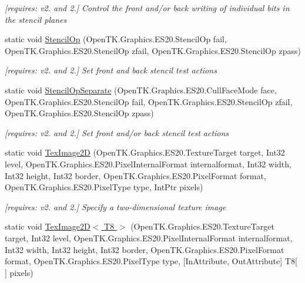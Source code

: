 \begin{DoxyCompactItemize}
\begin{DoxyCompactList}\small\item\em \mbox{[}requires\-: v2. and 2.\mbox{]} Control the front and/or back writing of individual bits in the stencil planes \end{DoxyCompactList}\item 
static void \hyperlink{class_open_t_k_1_1_graphics_1_1_e_s20_1_1_g_l_a177a6e640a89b1aff27d6d22c5ea5382}{Stencil\-Op} (Open\-T\-K.\-Graphics.\-E\-S20.\-Stencil\-Op fail, Open\-T\-K.\-Graphics.\-E\-S20.\-Stencil\-Op zfail, Open\-T\-K.\-Graphics.\-E\-S20.\-Stencil\-Op zpass)
\begin{DoxyCompactList}\small\item\em \mbox{[}requires\-: v2. and 2.\mbox{]} Set front and back stencil test actions \end{DoxyCompactList}\item 
static void \hyperlink{class_open_t_k_1_1_graphics_1_1_e_s20_1_1_g_l_a9c9f118ccf5592dabe9cc918e8df909b}{Stencil\-Op\-Separate} (Open\-T\-K.\-Graphics.\-E\-S20.\-Cull\-Face\-Mode face, Open\-T\-K.\-Graphics.\-E\-S20.\-Stencil\-Op fail, Open\-T\-K.\-Graphics.\-E\-S20.\-Stencil\-Op zfail, Open\-T\-K.\-Graphics.\-E\-S20.\-Stencil\-Op zpass)
\begin{DoxyCompactList}\small\item\em \mbox{[}requires\-: v2. and 2.\mbox{]} Set front and/or back stencil test actions \end{DoxyCompactList}\item 
static void \hyperlink{class_open_t_k_1_1_graphics_1_1_e_s20_1_1_g_l_abfe1aabd4fa5a54dc926a59eacc8c532}{Tex\-Image2\-D} (Open\-T\-K.\-Graphics.\-E\-S20.\-Texture\-Target target, Int32 level, Open\-T\-K.\-Graphics.\-E\-S20.\-Pixel\-Internal\-Format internalformat, Int32 width, Int32 height, Int32 border, Open\-T\-K.\-Graphics.\-E\-S20.\-Pixel\-Format format, Open\-T\-K.\-Graphics.\-E\-S20.\-Pixel\-Type type, Int\-Ptr pixels)
\begin{DoxyCompactList}\small\item\em \mbox{[}requires\-: v2. and 2.\mbox{]} Specify a two-\/dimensional texture image \end{DoxyCompactList}\item 
static void \hyperlink{class_open_t_k_1_1_graphics_1_1_e_s20_1_1_g_l_a6db1ae71bdbc018274c87095320ea738}{Tex\-Image2\-D$<$ T8 $>$} (Open\-T\-K.\-Graphics.\-E\-S20.\-Texture\-Target target, Int32 level, Open\-T\-K.\-Graphics.\-E\-S20.\-Pixel\-Internal\-Format internalformat, Int32 width, Int32 height, Int32 border, Open\-T\-K.\-Graphics.\-E\-S20.\-Pixel\-Format format, Open\-T\-K.\-Graphics.\-E\-S20.\-Pixel\-Type type, \mbox{[}In\-Attribute, Out\-Attribute\mbox{]} T8\mbox{[}$\,$\mbox{]} pixels)

\end{DoxyCompactItemize}
